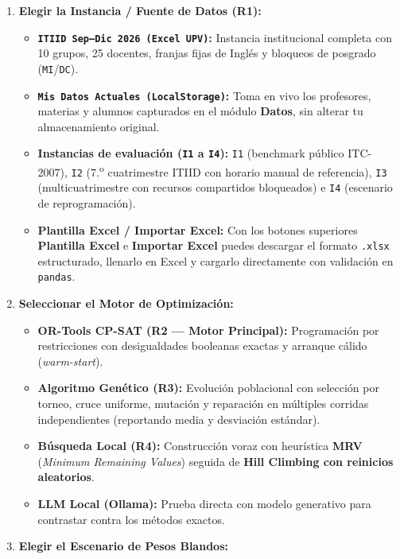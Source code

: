 \documentclass[11pt,letterpaper]{article}
\begin{document}
\begin{enumerate}
    \item \textbf{Elegir la Instancia / Fuente de Datos (R1):}
    \begin{itemize}
        \item \textbf{\texttt{ITIID Sep--Dic 2026 (Excel UPV)}:} Instancia institucional completa con 10 grupos, 25 docentes, franjas fijas de Inglés y bloqueos de posgrado (\texttt{MI}/\texttt{DC}).
        \item \textbf{\texttt{Mis Datos Actuales (LocalStorage)}:} Toma en vivo los profesores, materias y alumnos capturados en el módulo \textbf{Datos}, sin alterar tu almacenamiento original.
        \item \textbf{Instancias de evaluación (\texttt{I1} a \texttt{I4}):} \texttt{I1} (benchmark público ITC-2007), \texttt{I2} (7.\textsuperscript{o} cuatrimestre ITIID con horario manual de referencia), \texttt{I3} (multicuatrimestre con recursos compartidos bloqueados) e \texttt{I4} (escenario de reprogramación).
        \item \textbf{Plantilla Excel / Importar Excel:} Con los botones superiores \textbf{Plantilla Excel} e \textbf{Importar Excel} puedes descargar el formato \texttt{.xlsx} estructurado, llenarlo en Excel y cargarlo directamente con validación en \texttt{pandas}.
    \end{itemize}
    \item \textbf{Seleccionar el Motor de Optimización:}
    \begin{itemize}
        \item \textbf{OR-Tools CP-SAT (R2 --- Motor Principal):} Programación por restricciones con desigualdades booleanas exactas y arranque cálido (\textit{warm-start}).
        \item \textbf{Algoritmo Genético (R3):} Evolución poblacional con selección por torneo, cruce uniforme, mutación y reparación en múltiples corridas independientes (reportando media y desviación estándar).
        \item \textbf{Búsqueda Local (R4):} Construcción voraz con heurística \textbf{MRV} (\textit{Minimum Remaining Values}) seguida de \textbf{Hill Climbing con reinicios aleatorios}.
        \item \textbf{LLM Local (Ollama):} Prueba directa con modelo generativo para contrastar contra los métodos exactos.
    \end{itemize}
    \item \textbf{Elegir el Escenario de Pesos Blandos:}
    \begin{itemize}

\end{itemize}
\end{enumerate}
\end{document}
